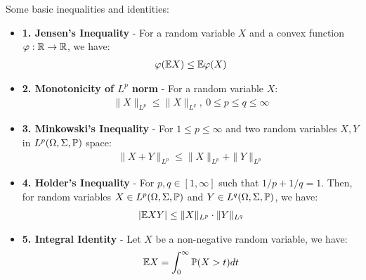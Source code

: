 \noindent Some basic inequalities and identities:
\begin{itemize}
    \item \textbf{1. Jensen's Inequality} - For a random variable $X$ and a convex function $\varphi:\mathbb{R}\to\mathbb{R}$, we have:
    \begin{align}
        \varphi(\mathbb{E} X) \le \mathbb{E}\varphi(X)
    \end{align}

    \item \textbf{2. Monotonicity of $L^p$ norm} - For a random variable $X$:
    \begin{align}
        \|X\|_{L^p} \le \|X\|_{L^q}, \ 0 \le p\le q \le \infty
    \end{align}

    \item \textbf{3. Minkowski's Inequality} - For $1\le p \le \infty$ and two random variables $X, Y$ in $L^p(\Omega, \Sigma, \mathbb{P})$ space:
    \begin{align}
        \|X+Y\|_{L^p} \le \|X\|_{L^p} + \|Y\|_{L^p}
    \end{align}

    \item \textbf{4. Holder's Inequality} - For $p, q\in [1, \infty]$ such that $1/p + 1/q=1$. Then, for random variables $X\in L^p(\Omega, \Sigma, \mathbb{P})$ and $Y\in L^q(\Omega, \Sigma, \mathbb{P})$, we have:
    \begin{align}
        |\mathbb{E} XY| \le \|X\|_{L^p}\cdot\|Y\|_{L^q} 
    \end{align}

    \item \textbf{5. Integral Identity} - Let $X$ be a non-negative random variable, we have:
    \begin{align}
        \mathbb{E} X = \int_0^\infty \mathbb{P}(X > t)dt
    \end{align}
\end{itemize}
